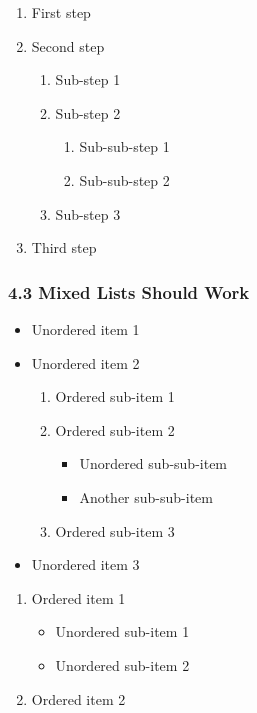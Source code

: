 \documentclass{article}
\begin{document}
\begin{enumerate}
\item  First step
\item  Second step
\begin{enumerate}
\item  Sub-step 1
\item  Sub-step 2
\begin{enumerate}
\item  Sub-sub-step 1
\item  Sub-sub-step 2
\end{enumerate}


\item  Sub-step 3
\end{enumerate}


\item  Third step
\end{enumerate}

\subsubsection{ 4.3 Mixed Lists Should Work}

\begin{itemize}
\item  Unordered item 1
\item  Unordered item 2
\begin{enumerate}
\item  Ordered sub-item 1
\item  Ordered sub-item 2
\begin{itemize}
\item  Unordered sub-sub-item
\item  Another sub-sub-item
\end{itemize}


\item  Ordered sub-item 3
\end{enumerate}


\item  Unordered item 3
\end{itemize}

\begin{enumerate}
\item  Ordered item 1
\begin{itemize}
\item  Unordered sub-item 1
\item  Unordered sub-item 2
\end{itemize}


\item  Ordered item 2
\end{enumerate}
\end{document}
